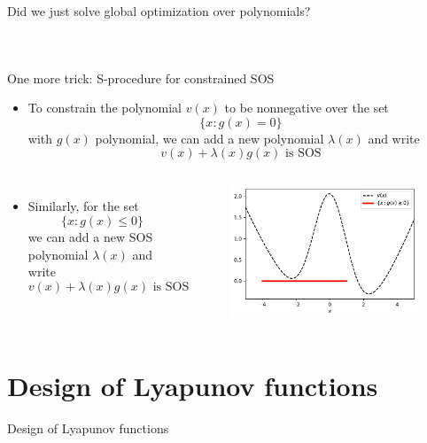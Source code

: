\documentclass[aspectratio=169]{beamer}
\begin{document}
\begin{frame}{Did we just solve global optimization over polynomials?}
\begin{columns}
\begin{figure}
{}
\end{figure}
\end{columns}
\end{frame}

\begin{frame}{One more trick: S-procedure for constrained SOS}
\begin{itemize}
\item
To constrain the polynomial $v(x)$ to be nonnegative over the set
$$
\{ x :  g(x) = 0 \}
$$
with $g(x)$ polynomial, we can add a new polynomial $\lambda(x)$ and write
$$
v(x) + \lambda(x) g(x) \text{ is SOS}
$$
\end{itemize}
\pause
\begin{columns}
\begin{itemize}
\item
Similarly, for the set
$$
\{ x :  g(x) \leq 0 \}
$$
we can add a new SOS polynomial $\lambda(x)$ and write
$$
v(x) + \lambda(x) g(x) \text{ is SOS}
$$
\end{itemize}
\begin{figure}
\includegraphics[width=\columnwidth]{figures/s_procedure.pdf}
\end{figure}
\end{columns}
\end{frame}

\section{Design of Lyapunov functions}
\begin{frame}
\huge
\centering
{\color{darkred} Design of Lyapunov functions}
\end{frame}
\end{document}
